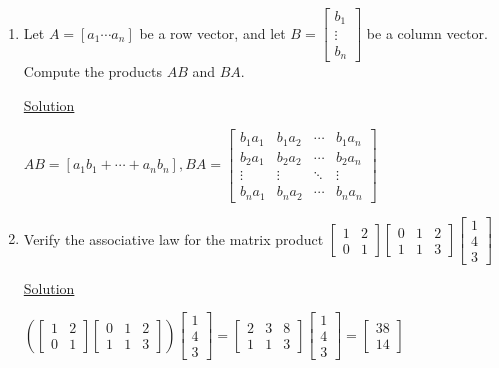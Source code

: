 \begin{enumerate}
\item Let $A= [a_1 \cdots a_n]$ be a row vector, and let $B = 
\begin{bmatrix}
b_1\\
\vdots\\
b_n
\end{bmatrix}$ be a 
column vector. Compute the products $AB$ and $BA$.

\underline{Solution}

$AB = [a_1b_1 + \cdots + a_nb_n], BA = \begin{bmatrix}
b_1a_1 & b_1a_2 & \cdots & b_1a_n \\
b_2a_1 & b_2a_2 & \cdots & b_2a_n \\
\vdots & \vdots & \ddots & \vdots \\
b_na_1 & b_na_2 & \cdots & b_na_n
\end{bmatrix}$

\item Verify the associative law for the matrix product $\begin{bmatrix}
1 & 2\\
0 & 1
\end{bmatrix} \begin{bmatrix}
0 & 1 & 2\\
1 & 1 & 3
\end{bmatrix} \begin{bmatrix}
1\\
4\\
3
\end{bmatrix}$

\underline{Solution}

$\left(\begin{bmatrix}
1 & 2\\
0 & 1
\end{bmatrix} \begin{bmatrix}
0 & 1 & 2\\
1 & 1 & 3
\end{bmatrix}\right) \begin{bmatrix}
1\\
4\\
3
\end{bmatrix} = \begin{bmatrix}
2 & 3 & 8\\
1 & 1 & 3
\end{bmatrix} \begin{bmatrix}
1\\
4\\
3
\end{bmatrix} = \begin{bmatrix}
38\\
14
\end{bmatrix}$


\end{enumerate}
